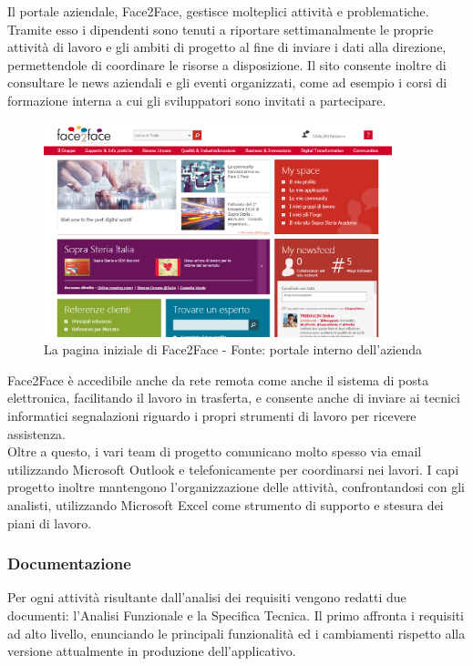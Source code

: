	Il portale aziendale, Face2Face, gestisce molteplici attività e problematiche. Tramite esso i dipendenti sono tenuti a riportare settimanalmente le proprie attività di lavoro e gli ambiti di progetto al fine di inviare i dati alla direzione, permettendole di coordinare le risorse a disposizione. Il sito consente inoltre di consultare le news aziendali e gli eventi organizzati, come ad esempio i corsi di formazione interna a cui gli sviluppatori sono invitati a partecipare.

	\begin{figure}[H]
		\centering
	   	\includegraphics[width=0.9\textwidth]{immagini/face2face}
	   	\caption{La pagina iniziale di Face2Face - Fonte: portale interno dell'azienda}
	\end{figure}
		
	Face2Face è accedibile anche da rete remota come anche il sistema di posta elettronica, facilitando il lavoro in trasferta, e consente anche di inviare ai tecnici informatici segnalazioni riguardo i propri strumenti di lavoro per ricevere assistenza.\\
	
	Oltre a questo, i vari team di progetto comunicano molto spesso via email utilizzando Microsoft Outlook e telefonicamente per coordinarsi nei lavori. I capi progetto inoltre mantengono l'organizzazione delle attività, confrontandosi con gli analisti, utilizzando Microsoft Excel come strumento di supporto e stesura dei piani di lavoro.
	
	\subsubsection{Documentazione}
	Per ogni attività risultante dall'analisi dei requisiti vengono redatti due documenti: l'Analisi Funzionale e la Specifica Tecnica.
	Il primo affronta i requisiti ad alto livello, enunciando le principali funzionalità ed i cambiamenti rispetto alla versione attualmente in produzione dell'applicativo. \\
	
